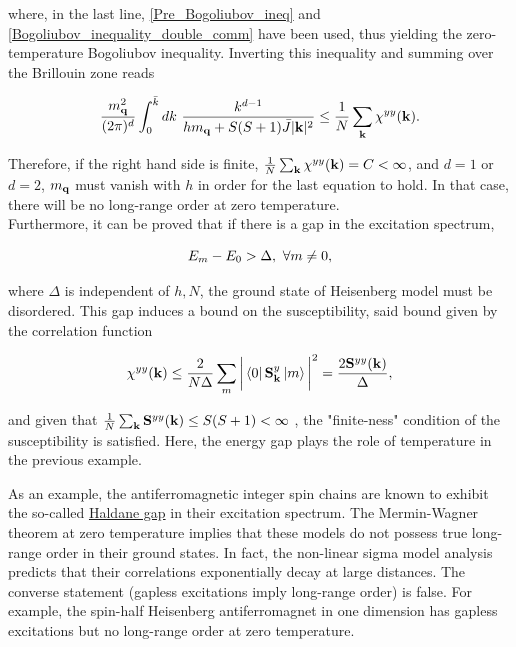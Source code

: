\documentclass{homework}
\begin{document}
where, in the last line, 
\cref{Pre_Bogoliubov_ineq} and \cref{Bogoliubov_inequality_double_comm} have been used, thus yielding the zero-temperature Bogoliubov inequality. Inverting this inequality and summing over the Brillouin zone reads

\begin{equation}
    \frac{m_{\bf q}^2}{(2\pi)^d} \int_{0}^{\bar{k}} dk \textnormal{ } \frac{k^{d-1}}{h m_{\bf q} + S(S+1) \bar{J} |{\bf k}|^2} \leq \frac{1}{N} \sum_{{\bf k}} \chi^{yy}({\bf k}).
\end{equation}

Therefore, if the right hand side is finite, $\frac{1}{N} \sum_{{\bf k}} \chi^{yy}({\bf k}) = C < \infty$, and $d=1$ or $d=2$, $m_{{\bf q}}$ must vanish with $h$ in order for the last equation to hold. In that case, there will be no long-range order at zero temperature. \\

Furthermore, it can be proved that if there is a gap in the excitation spectrum, 

$$
    E_m - E_0 > \Delta, \textnormal{ } \forall m \neq 0,
$$

where $\Delta$ is independent of $h, N$, the ground state of Heisenberg model must be disordered. This gap induces a bound on the susceptibility, said bound given by the correlation function

\begin{equation}
    \chi^{yy}({\bf k}) \leq \frac{2}{N \Delta} \sum_{m} \bigg|\bra{0}\spin_{{\bf k}}^y \ket{m}\bigg|^2 = \frac{2 \spin^{yy}({\bf k})}{\Delta},
\end{equation}

and given that $\frac{1}{N} \sum_{{\bf k}} {\bf S}^{yy}({\bf k}) \leq S(S+1) < \infty$ , the "finite-ness" condition of the susceptibility is satisfied. Here, the energy gap plays the role of temperature in the previous example. \\

\begin{tcolorbox}[colback=my-blue, 
title = Physical Context]

As an example, the antiferromagnetic integer spin chains are known to exhibit the so-called \underline{Haldane gap} in their excitation spectrum. The Mermin-Wagner theorem at zero temperature implies that these models do not possess true long-range order in their ground states. In fact, the non-linear sigma model analysis predicts that their correlations exponentially decay at large distances. The converse statement (gapless excitations imply long-range order) is false. For example, the spin-half Heisenberg antiferromagnet in one dimension has gapless excitations but no long-range order at zero temperature. 

\end{tcolorbox}
\end{document}
